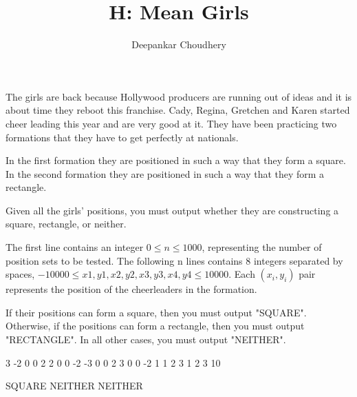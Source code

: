 \documentclass{article}
\title{H: Mean Girls}
\author{Deepankar Choudhery}
\begin{document}
\begin{problemDescription}
The girls are back because Hollywood producers are running out of ideas and it is about time they reboot this franchise. Cady, Regina, Gretchen and Karen started cheer leading this year and are very good at it. They have been practicing two formations that they have to get perfectly at nationals.

In the first formation they are positioned  in such a way that they form a square. In the second formation they are positioned in such a way that they form a rectangle.

Given all the girls’ positions, you must output whether they are constructing a square, rectangle, or neither. 
\end{problemDescription}

\begin{inputDescription}
The first line contains an integer $0 \leq n \leq 1000$, representing the number of position sets to be tested. The following n lines contains 8 integers separated by spaces, $-10000 \leq x1, y1, x2, y2, x3, y3, x4, y4 \leq 10000$. Each $(x_i, y_i)$ pair represents the position of the cheerleaders in the formation.
\end{inputDescription}

\begin{outputDescription}
If their positions can form a square, then you must output "SQUARE". Otherwise, if the positions can form a rectangle, then you must output "RECTANGLE". In all other cases, you must output "NEITHER".

\end{outputDescription}

\begin{sampleInput}
3
-2 0 0 2 2 0 0 -2
-3 0 0 2 3 0 0 -2
1 1 2 3 1 2 3 10
\end{sampleInput}
\begin{sampleOutput}
SQUARE
NEITHER
NEITHER
\end{sampleOutput}
\end{document}
